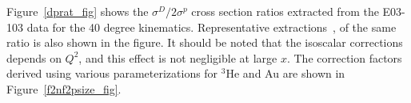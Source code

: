 

Figure~\ref{dprat_fig} shows the  $\sigma^D/2\sigma^p$ cross section ratios
extracted from the E03-103 data for the 40 degree kinematics. Representative
extractions~\cite{hermes_dbyp, arrington12b}, of the same ratio is also shown
in the figure. It should be noted that the isoscalar corrections depends on
$Q^2$, and this effect is not negligible at large $x$. The correction factors
derived using various parameterizations for $^3$He and Au are shown in
Figure~\ref{f2nf2psize_fig}.

